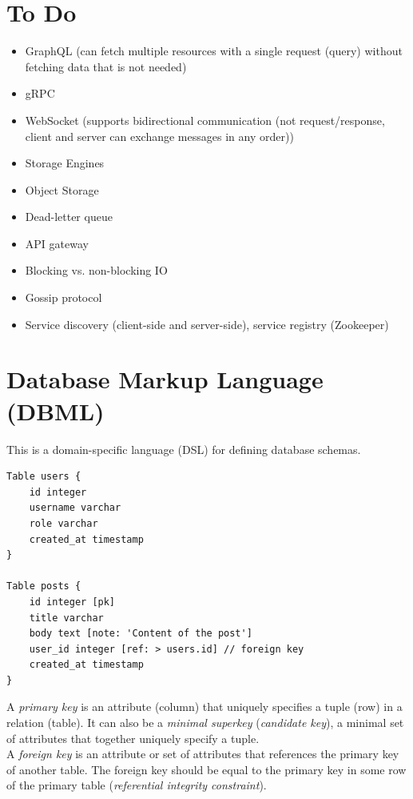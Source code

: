 \documentclass[12pt, titlepage]{article}
\begin{document}
\section{To Do}

\begin{itemize}
  \item GraphQL (can fetch multiple resources with a single request (query) without fetching data that is not needed)
  \item gRPC
  \item WebSocket (supports bidirectional communication (not request/response, client and server can exchange messages in any order))
  \item Storage Engines
  \item Object Storage
  \item Dead-letter queue
  \item API gateway
  \item Blocking vs. non-blocking IO
  \item Gossip protocol
  \item Service discovery (client-side and server-side), service registry (Zookeeper)
\end{itemize}

\appendix
\newpage

\section{Database Markup Language (DBML)}

This is a domain-specific language (DSL) for defining database schemas.

\begin{verbatim}
Table users {
    id integer
    username varchar
    role varchar
    created_at timestamp
}

Table posts {
    id integer [pk]
    title varchar
    body text [note: 'Content of the post']
    user_id integer [ref: > users.id] // foreign key
    created_at timestamp
}
\end{verbatim}

A \textit{primary key} is an attribute (column) that uniquely specifies a tuple (row) in a relation (table). It can also be a \textit{minimal superkey} (\textit{candidate key}), a minimal set of attributes that together uniquely specify a tuple. \\

A \textit{foreign key} is an attribute or set of attributes that references the primary key of another table. The foreign key should be equal to the primary key in some row of the primary table (\textit{referential integrity constraint}). \\
\end{document}

